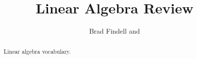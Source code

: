 \documentclass[numbers,nooutcomes,twoside,hints]{xourse}
\title{Linear Algebra Review}
\author{Brad Findell and }
\begin{document}
\begin{abstract}
Linear algebra vocabulary.  
\end{abstract}
\maketitle





\end{document}
